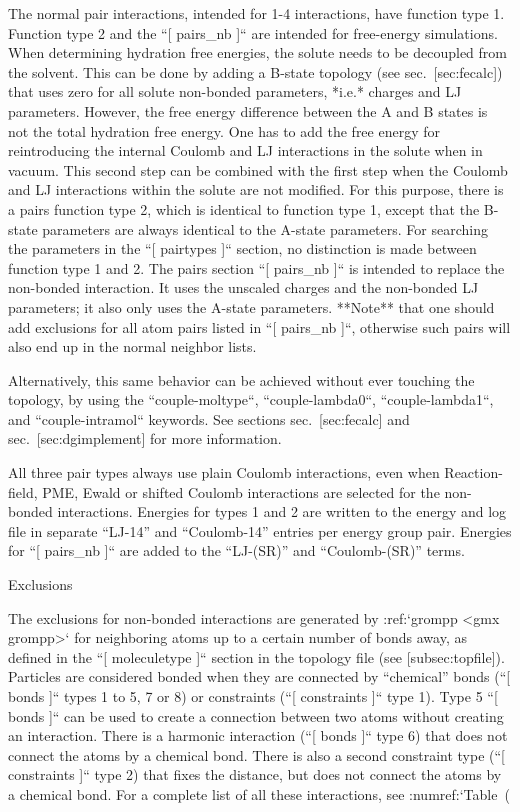 The normal pair interactions, intended for 1-4 interactions, have
function type 1. Function type 2 and the ``[ pairs_nb ]`` are intended for free-energy
simulations. When determining hydration free energies, the solute needs
to be decoupled from the solvent. This can be done by adding a B-state
topology (see sec. [sec:fecalc]) that uses zero for all solute
non-bonded parameters, *i.e.* charges and LJ parameters. However, the
free energy difference between the A and B states is not the total
hydration free energy. One has to add the free energy for reintroducing
the internal Coulomb and LJ interactions in the solute when in vacuum.
This second step can be combined with the first step when the Coulomb
and LJ interactions within the solute are not modified. For this
purpose, there is a pairs function type 2, which is identical to
function type 1, except that the B-state parameters are always identical
to the A-state parameters. For searching the parameters in the ``[ pairtypes ]`` section,
no distinction is made between function type 1 and 2. The pairs section
``[ pairs_nb ]`` is intended to replace the non-bonded interaction. It uses the unscaled
charges and the non-bonded LJ parameters; it also only uses the A-state
parameters. **Note** that one should add exclusions for all atom pairs
listed in ``[ pairs_nb ]``, otherwise such pairs will also end up in the normal neighbor
lists.

Alternatively, this same behavior can be achieved without ever touching
the topology, by using the ``couple-moltype``, ``couple-lambda0``,
``couple-lambda1``, and ``couple-intramol`` keywords. See sections
sec. [sec:fecalc] and sec. [sec:dgimplement] for more information.

All three pair types always use plain Coulomb interactions, even when
Reaction-field, PME, Ewald or shifted Coulomb interactions are selected
for the non-bonded interactions. Energies for types 1 and 2 are written
to the energy and log file in separate “LJ-14” and “Coulomb-14” entries
per energy group pair. Energies for ``[ pairs_nb ]`` are added to the “LJ-(SR)” and
“Coulomb-(SR)” terms.

Exclusions
~~~~~~~~~~

The exclusions for non-bonded interactions are generated by :ref:`grompp <gmx grompp>` for
neighboring atoms up to a certain number of bonds away, as defined in
the ``[ moleculetype ]`` section in the topology file (see [subsec:topfile]). Particles are
considered bonded when they are connected by “chemical” bonds (``[ bonds ]`` types 1
to 5, 7 or 8) or constraints (``[ constraints ]`` type 1). Type 5 ``[ bonds ]`` can be used to create a
connection between two atoms without creating an interaction. There is a
harmonic interaction (``[ bonds ]`` type 6) that does not connect the atoms by a
chemical bond. There is also a second constraint type (``[ constraints ]`` type 2) that
fixes the distance, but does not connect the atoms by a chemical bond.
For a complete list of all these interactions, see :numref:`Table (%

